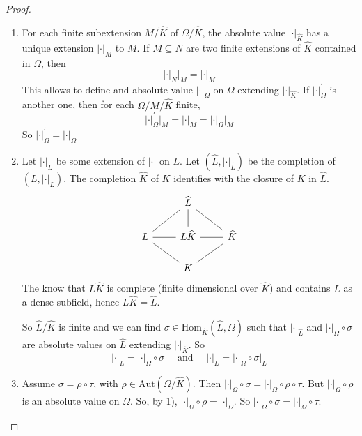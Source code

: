 \begin{proof}{} \(\) 
\begin{enumerate}[label = \arabic*.]
    \item For each finite subextension \(M / \widehat{K}\) of \(\Omega /
        \widehat{K}\), the absolute value \(|\cdot |_\widehat{K}\) has a unique
        extension \(|\cdot |_M\) to \(M\). If \(M \subseteq N \) are two finite
        extensions of \(\widehat{K}\) contained in \(\Omega\), then 
        \[
          |\cdot |_N \big|_M = |\cdot |_M
        \]
        This allows to define and absolute value \(|\cdot |_\Omega\) on
        \(\Omega\) extending \(|\cdot |_\widehat{K}\). If \(|\cdot |_{\Omega}
        ^{\prime}\) is another one, then for each \(\Omega / M / \widehat{K}\)
        finite, 
        \[
          |\cdot |^{\prime}_{\Omega} \big|_M = |\cdot |_M = |\cdot |_\Omega
          \big|_M
        \]
        So \(|\cdot |^{\prime}_\Omega = |\cdot |_\Omega\) 
    \item Let \(|\cdot |_L\) be some extension of \(|\cdot |\) on \(L\). Let
        \({\left(\widehat{L}, |\cdot |_\widehat{L}\right)}\) be the completion of \({(L,
        |\cdot |_L)}\). The completion \(\widehat{K}\) of \(K\) identifies with
        the closure of \(K\) in \(\widehat{L}\).
    \[
\begin{tikzcd}
	& {\widehat{L}} & \\
	L & {L\widehat{K}} & {\widehat{K}} \\
	& K
	\arrow[no head, from=2-1, to=1-2]
	\arrow[no head, from=2-1, to=2-2]
	\arrow[no head, from=2-3, to=1-2]
	\arrow[no head, from=2-3, to=2-2]
	\arrow[no head, from=3-2, to=2-1]
	\arrow[no head, from=3-2, to=2-3]
	\arrow[no head, from=2-2, to=1-2]
\end{tikzcd}
    \]
        The know that \(L\widehat{K}\) is complete (finite dimensional over
        \(\widehat{K}\)) and contains \(L\) as a dense subfield, hence
        \(L\widehat{K} = \widehat{L}\).

        So \(\widehat{L} / \widehat{K}\) is finite and we can find \(\sigma \in
        \mathrm{Hom}_\widehat{K} {(\widehat{L}, \Omega)}\) such that \(|\cdot
        |_\widehat{L}\) and \(|\cdot |_\Omega \circ \sigma\) are absolute values
        on \(\widehat{L}\) extending \(|\cdot |_\widehat{K}\). So
        \[
        |\cdot |_{\widehat{L}} = |\cdot |_\Omega \circ \sigma \quad \text{ and }
          \quad |\cdot |_L = |\cdot |_\Omega \circ \sigma|_L
        \]
    \item Assume \(\sigma = \rho \circ \tau\), with \(\rho \in
        \mathrm{Aut}{(\Omega / \widehat{K})}\). Then \(|\cdot |_\Omega \circ
        \sigma = |\cdot |_\Omega \circ \rho \circ \tau\). But \(|\cdot |_\Omega
        \circ \rho\) is an absolute value on \(\Omega\). So, by 1), \(|\cdot
        |_\Omega \circ \rho = |\cdot |_\Omega\). So \(|\cdot |_\Omega \circ
        \sigma = |\cdot |_\Omega \circ \tau\).


\end{enumerate}
\end{proof}
